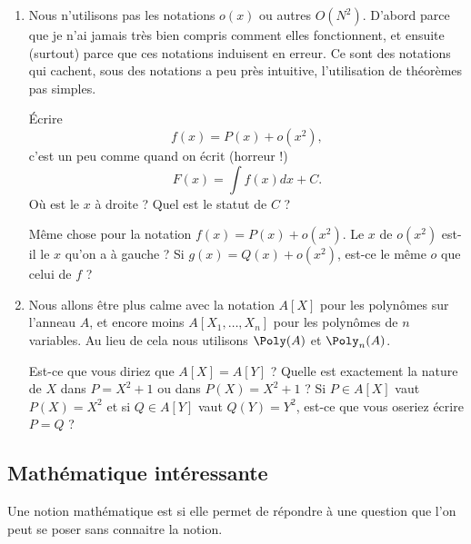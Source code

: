 \begin{enumerate}
	\item
	      Nous n'utilisons pas les notations \( o(x)\) ou autres \( O(N^2)\). D'abord parce que je n'ai jamais très bien compris comment elles fonctionnent, et ensuite (surtout) parce que ces notations induisent en erreur. Ce sont des notations qui cachent, sous des notations a peu près intuitive, l'utilisation de théorèmes pas simples.

	      Écrire
	      \begin{equation}
		      f(x)=P(x)+o(x^2),
	      \end{equation}
	      c'est un peu comme quand on écrit (horreur !)
	      \begin{equation}
		      F(x)=\int f(x)dx+C.
	      \end{equation}
	      Où est le \( x\) à droite ? Quel est le statut de \( C \) ?

	      Même chose pour la notation \( f(x)=P(x)+o(x^2)\). Le \( x\) de \( o(x^2)\) est-il le \( x\) qu'on a à gauche ? Si \( g(x)=Q(x)+o(x^2)\), est-ce le même \( o\) que celui de \( f\) ?
	\item
	      Nous allons être plus calme avec la notation \( A[X]\) pour les polynômes sur l'anneau \( A\), et encore moins \( A[X_1,\ldots, X_n]\) pour les polynômes de \( n\) variables. Au lieu de cela nous utilisons \( \Poly(A)\) et \( \Poly_n(A)\).

	      Est-ce que vous diriez que \( A[X]=A[Y]\) ? Quelle est exactement la nature de \( X\) dans \( P=X^2+1\) ou dans \( P(X)=X^2+1\) ? Si \( P\in A[X]\) vaut \( P(X)=X^2\)  et si \( Q\in A[Y]\) vaut \( Q(Y)=Y^2\), est-ce que vous oseriez écrire \( P=Q\) ?
\end{enumerate}

\subsection{Mathématique intéressante}
\label{SUBooINTROmathInteressantes}

\begin{definition}      \label{DEFooDABVooKdDyBw}
	Une notion mathématique est  si elle permet de répondre à une question que l'on peut se poser sans connaitre la notion.
\end{definition}


